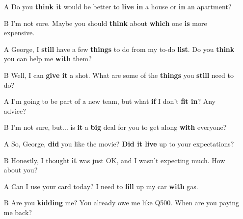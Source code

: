 \begin{itemize}
  \item[A] Do you \textbf{think it} would be better to \textbf{live in} a house or \textbf{in} an apartment?
  \item[B] I'm not sure. Maybe you should \textbf{think} about \textbf{which} one \textbf{is} more expensive. 
\end{itemize}

\begin{itemize}
  \item[A] George, I \textbf{still} have a few \textbf{things} to do from my to-do \textbf{list}. Do you \textbf{think} you can help me \textbf{with} them?
  \item[B] Well, I can \textbf{give it} a shot. What are some of the \textbf{things} you \textbf{still} need to do? 
\end{itemize}

\begin{itemize}
  \item[A] I'm going to be part of a new team, but what \textbf{if} I don't \textbf{fit in}? Any advice?
  \item[B] I'm not sure, but... is \textbf{it} a \textbf{big} deal for you to get along \textbf{with} everyone?
\end{itemize}

\begin{itemize}
  \item[A] So, George, \textbf{did} you like the movie? \textbf{Did it live} up to your expectations?
  \item[B] Honestly, I thought \textbf{it} was just OK, and I wasn't expecting much. How about you?
\end{itemize}

\begin{itemize}
  \item[A] Can I use your card today? I need to \textbf{fill} up my car \textbf{with} gas.
  \item[B] Are you \textbf{kidding} me? You already owe me like Q500. When are you paying me back? 
\end{itemize}





\newpage






